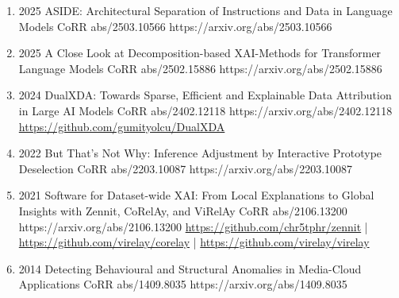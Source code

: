 {\begin{enumerate}
    
        \item {}
                        {2025}
                        {ASIDE: Architectural Separation of Instructions and Data in Language Models}
                        {CoRR abs/2503.10566}
                        {https://arxiv.org/abs/2503.10566}    
                        
                        
        \item {}
                        {2025}
                        {A Close Look at Decomposition-based XAI-Methods for Transformer Language Models}
                        {CoRR abs/2502.15886}
                        {https://arxiv.org/abs/2502.15886}
                        

        \item {}
                        {2024}
                        {DualXDA: Towards Sparse, Efficient and Explainable Data Attribution in Large AI Models}
                        {CoRR abs/2402.12118}
                        {https://arxiv.org/abs/2402.12118}
                        {\\\href{https://github.com/gumityolcu/DualXDA}{https://github.com/gumityolcu/DualXDA}}
                        

        \item {}
                        {2022}
                        {But That's Not Why: Inference Adjustment by Interactive Prototype Deselection}
                        {CoRR abs/2203.10087}
                        {https://arxiv.org/abs/2203.10087}

        \item {}
                        {2021}
                        {Software for Dataset-wide XAI: From Local Explanations to Global Insights with Zennit, CoRelAy, and ViRelAy}
                        {CoRR abs/2106.13200}
                        {https://arxiv.org/abs/2106.13200}
                        {   \href{https://github.com/chr5tphr/zennit}{https://github.com/chr5tphr/zennit} | \\
                            \href{https://github.com/virelay/corelay}{https://github.com/virelay/corelay} |
                            \href{https://github.com/virelay/virelay}{https://github.com/virelay/virelay}
                        }

        \item {}
                        {2014}
                        {Detecting Behavioural and Structural Anomalies in Media-Cloud Applications}
                        {CoRR abs/1409.8035}
                        {https://arxiv.org/abs/1409.8035}

    \end{enumerate}

}


